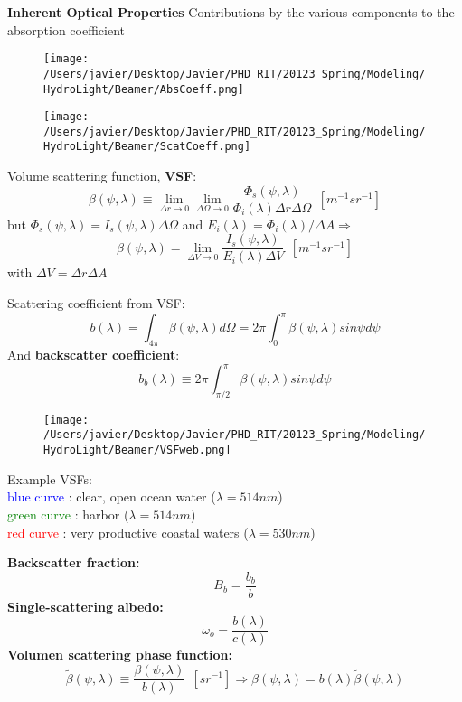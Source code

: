 {\bf Inherent Optical Properties}
Contributions by the various components to the absorption coefficient
\begin{figure}[H]
\centering
  		\texttt{[image: /Users/javier/Desktop/Javier/PHD\_RIT/20123\_Spring/Modeling/HydroLight/Beamer/AbsCoeff.png]}
\end{figure}


\begin{figure}[H]
\centering
  		\texttt{[image: /Users/javier/Desktop/Javier/PHD\_RIT/20123\_Spring/Modeling/HydroLight/Beamer/ScatCoeff.png]}
\end{figure}


Volume scattering function, \textbf{VSF}:
\begin{equation}
	\beta(\psi,\lambda)\equiv \lim_{\Delta r\to 0} \lim_{\Delta \Omega\to 0}  \frac{\Phi_s(\psi,\lambda)}{\Phi_i(\lambda)\Delta r\Delta \Omega}~~\left[m^{-1}sr^{-1} \right]
\end{equation}
but $\Phi_s(\psi,\lambda)=I_s(\psi,\lambda)\Delta \Omega$ and $E_i(\lambda)=\Phi_i(\lambda)/\Delta A \Rightarrow$
\begin{equation}
	\beta(\psi,\lambda)= \lim_{\Delta V\to 0} \frac{I_s(\psi,\lambda)}{E_i(\lambda)\Delta V}~~\left[m^{-1}sr^{-1} \right]
\end{equation}
with $\Delta V=\Delta r\Delta A$

Scattering coefficient from VSF:
\begin{equation}
	b(\lambda)=\int_{4\pi} \beta(\psi,\lambda)d\Omega=2\pi\int_0^\pi \beta(\psi,\lambda)sin\psi d\psi
\end{equation}
And \textbf{backscatter coefficient}:
\begin{equation}
	b_b(\lambda)\equiv 2\pi\int_{\pi/2}^\pi \beta(\psi,\lambda)sin\psi d\psi
\end{equation}


\begin{figure}[H]
\centering
  		\texttt{[image: /Users/javier/Desktop/Javier/PHD\_RIT/20123\_Spring/Modeling/HydroLight/Beamer/VSFweb.png]}
\end{figure}
Example VSFs:\\
\textcolor{blue}{blue curve} : clear, open ocean water ($\lambda = 514 nm$)\\
\textcolor{green}{green curve} : harbor ($\lambda = 514 nm$)\\
\textcolor{red}{red curve} : very productive coastal waters ($\lambda = 530 nm$)

\textbf{Backscatter fraction:}
\begin{equation}
	B_b=\frac{b_b}{b}
\end{equation}
\textbf{Single-scattering albedo:}
\begin{equation}
	\omega_o=\frac{b(\lambda)}{c(\lambda)}
\end{equation}
\textbf{Volumen scattering phase function:}
\begin{equation}
	\tilde{\beta}(\psi,\lambda)\equiv \frac{\beta(\psi,\lambda)}{b(\lambda)}~~\left[sr^{-1} \right]\Rightarrow \beta(\psi,\lambda)=b(\lambda)\tilde{\beta}(\psi,\lambda)
\end{equation}

